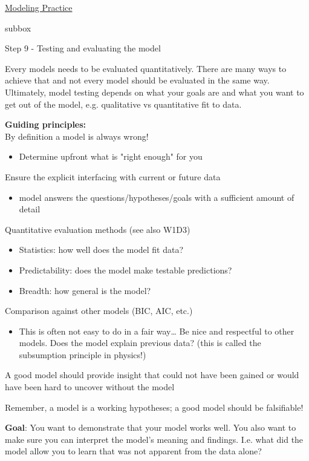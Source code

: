 \begin{textbox}{\href{https://compneuro.neuromatch.io/projects/modelingsteps/ModelingSteps_5through10.html}{Modeling Practice  } }

\begin{subbox}{subbox}{Step 9 - Testing and evaluating the model

}
\scriptsize
Every models needs to be evaluated quantitatively. There are many ways to achieve that and not every model should be evaluated in the same way. Ultimately, model testing depends on what your goals are and what you want to get out of the model, e.g. qualitative vs quantitative fit to data. 

\textbf{Guiding principles:}\\
 By definition a model is always wrong!
  \begin{itemize}
    \item  Determine upfront what is "right enough" for you
    \end{itemize}
Ensure the explicit interfacing with current or future data

 \begin{itemize}
    \item  model answers the questions/hypotheses/goals with a sufficient amount of detail
    \end{itemize}
Quantitative evaluation methods (see also W1D3)
  \begin{itemize}
    \item  Statistics:  how well does the model fit data?
  \item Predictability: does the model make testable predictions?
  \item Breadth: how general is the model?
  \end{itemize}
 Comparison against other models (BIC, AIC, etc.)
\begin{itemize}
    \item  This is often not easy to do in a fair way… Be nice and respectful to other models.
Does the model explain previous data? (this is called the subsumption principle in physics!)
\end{itemize}
A good model should provide insight that could not have been gained or would have been hard to uncover without the model

Remember, a model is a working hypotheses; a good model should be falsifiable!

\textbf{Goal}: You want to demonstrate that your model works well. You also want to make sure you can interpret the model's meaning and findings. I.e. what did the model allow you to learn that was not apparent from the data alone?




\end{subbox}
\end{textbox}
